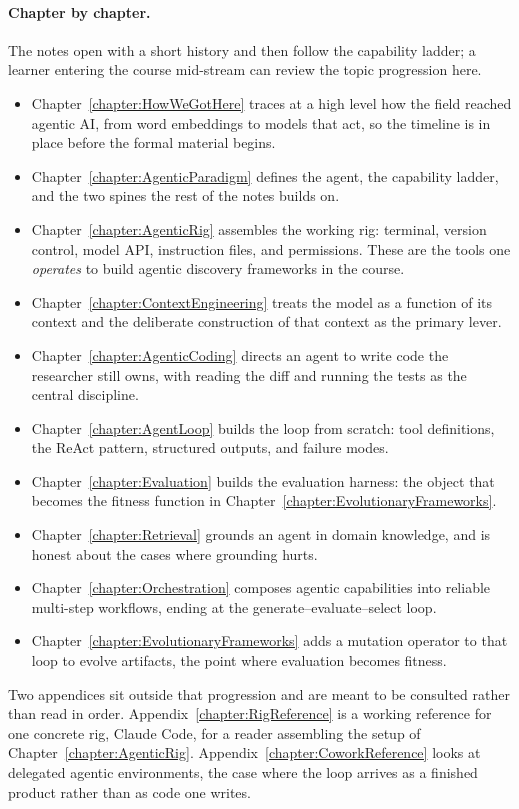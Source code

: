 \paragraph{Chapter by chapter.}
The notes open with a short history and then follow the capability ladder; a learner entering the course mid-stream can review the topic progression here.
\begin{itemize}
\item Chapter~\ref{chapter:HowWeGotHere} traces at a high level how the field reached agentic AI, from word embeddings to models that act, so the timeline is in place before the formal material begins.
\item Chapter~\ref{chapter:AgenticParadigm} defines the agent, the capability ladder, and the two spines the rest of the notes builds on.
\item Chapter~\ref{chapter:AgenticRig} assembles the working rig: terminal, version control, model API, instruction files, and permissions. These are the tools one \emph{operates} to build agentic discovery frameworks in the course.
\item Chapter~\ref{chapter:ContextEngineering} treats the model as a function of its context and the deliberate construction of that context as the primary lever.
\item Chapter~\ref{chapter:AgenticCoding} directs an agent to write code the researcher still owns, with reading the diff and running the tests as the central discipline.
\item Chapter~\ref{chapter:AgentLoop} builds the loop from scratch: tool definitions, the ReAct pattern, structured outputs, and failure modes.
\item Chapter~\ref{chapter:Evaluation} builds the evaluation harness: the object that becomes the fitness function in Chapter~\ref{chapter:EvolutionaryFrameworks}.
\item Chapter~\ref{chapter:Retrieval} grounds an agent in domain knowledge, and is honest about the cases where grounding hurts.
\item Chapter~\ref{chapter:Orchestration} composes agentic capabilities into reliable multi-step workflows, ending at the generate--evaluate--select loop.
\item Chapter~\ref{chapter:EvolutionaryFrameworks} adds a mutation operator to that loop to evolve artifacts, the point where evaluation becomes fitness.
\end{itemize}
Two appendices sit outside that progression and are meant to be consulted rather than read in order.
Appendix~\ref{chapter:RigReference} is a working reference for one concrete rig, Claude Code, for a reader assembling the setup of Chapter~\ref{chapter:AgenticRig}.
Appendix~\ref{chapter:CoworkReference} looks at delegated agentic environments, the case where the loop arrives as a finished product rather than as code one writes.

